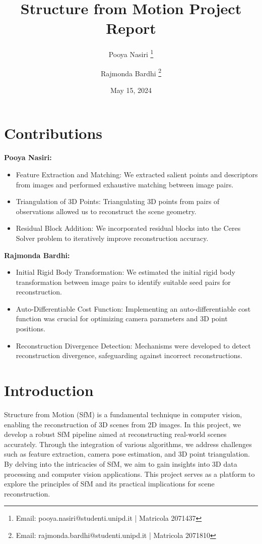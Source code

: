 \documentclass{article}
\title{Structure from Motion Project Report}
\author{Pooya Nasiri \thanks{Email: pooya.nasiri@studenti.unipd.it | Matricola 2071437} \and Rajmonda Bardhi \thanks{Email: rajmonda.bardhi@studenti.unipd.it | Matricola 2071810}}
\date{May 15, 2024}
\begin{document}
\maketitle

\section*{Contributions}
\noindent \textbf{Pooya Nasiri:}
\begin{itemize}
    \item Feature Extraction and Matching: We extracted salient points and descriptors from images and performed exhaustive matching between image pairs.
    \item Triangulation of 3D Points: Triangulating 3D points from pairs of observations allowed us to reconstruct the scene geometry.
    \item Residual Block Addition: We incorporated residual blocks into the Ceres Solver problem to iteratively improve reconstruction accuracy.
\end{itemize}

\noindent \textbf{Rajmonda Bardhi:}
\begin{itemize}
    \item Initial Rigid Body Transformation: We estimated the initial rigid body transformation between image pairs to identify suitable seed pairs for reconstruction.
    \item Auto-Differentiable Cost Function: Implementing an auto-differentiable cost function was crucial for optimizing camera parameters and 3D point positions.
    \item Reconstruction Divergence Detection: Mechanisms were developed to detect reconstruction divergence, safeguarding against incorrect reconstructions.
\end{itemize}

\section{Introduction}

Structure from Motion (SfM) is a fundamental technique in computer vision, enabling the reconstruction of 3D scenes from 2D images. In this project, we develop a robust SfM pipeline aimed at reconstructing real-world scenes accurately. Through the integration of various algorithms, we address challenges such as feature extraction, camera pose estimation, and 3D point triangulation. By delving into the intricacies of SfM, we aim to gain insights into 3D data processing and computer vision applications. This project serves as a platform to explore the principles of SfM and its practical implications for scene reconstruction.
\end{document}
